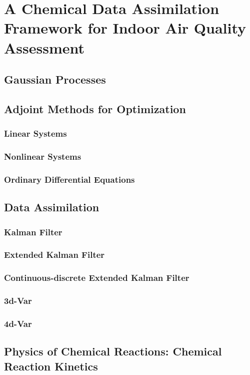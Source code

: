 \chapter{A Chemical Data Assimilation Framework for Indoor Air Quality Assessment}\label{ch:autochem}


\section{Gaussian Processes}

\section{Adjoint Methods for Optimization}
\subsection{Linear Systems}
\subsection{Nonlinear Systems}
\subsection{Ordinary Differential Equations}


\section{Data Assimilation}
\subsection{Kalman Filter}
\subsection{Extended Kalman Filter}
\subsection{Continuous-discrete Extended Kalman Filter}
\subsection{3d-Var}
\subsection{4d-Var}

\section{Physics of Chemical Reactions: Chemical Reaction Kinetics}
